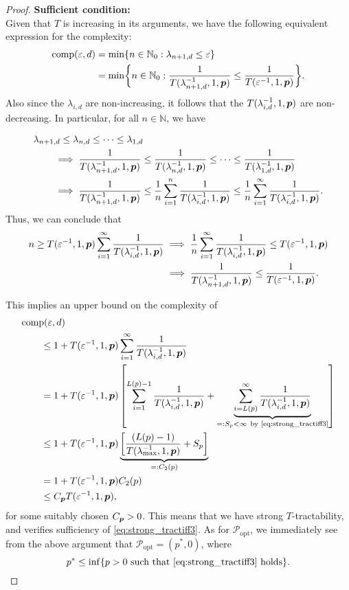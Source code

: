 \documentclass[11pt,a4paper]{article}
\begin{document}
\begin{proof}
\textbf{Sufficient condition:}\\
Given that $T$ is increasing in its arguments, we have the following equivalent expression for the complexity:
    \begin{align*}
    \operatorname{comp}(\varepsilon, d) &= \min \{n \in \mathbb{N}_{0} : \lambda_{n+1, d} \le \varepsilon\} \\
    &= \min \biggl\{n \in \mathbb{N}_{0} : \frac{1}{T(\lambda_{n+1,d}^{-1},1,\boldsymbol{p})}\le \frac{1}{T(\varepsilon^{-1},1,\boldsymbol{p}) }\biggr\}.
\end{align*}
Also since the $\lambda_{i,d}$ are non-increasing, it follows that the $T(\lambda_{i,d}^{-1},1,\boldsymbol{p})$ are non-decreasing. In particular, for all $n\in \mathbb{N}$, we have

\begin{align*}
    \MoveEqLeft{\lambda_{n+1,d} \le \lambda_{n,d} \le \cdots \le \lambda_{1,d}} \\
    & \implies \frac{1}{T(\lambda_{n+1, d}^{-1},1,\vp)} \le \frac{1}{T(\lambda_{n, d}^{-1},1,\vp)} \le \cdots \le \frac{1}{T(\lambda_{1, d}^{-1},1,\vp)} \\
    & \implies \frac{1}{T(\lambda_{n+1, d}^{-1},1,\vp) }
    \le \frac 1n \sum_{i=1}^n  \frac{1}{T(\lambda_{i, d}^{-1},1,\vp) }
    \le \frac 1n \sum_{i=1}^\infty  \frac{1}{T(\lambda_{i, d}^{-1},1,\vp)}.
\end{align*}
Thus, we can conclude that
\begin{align*}
    n \ge T(\varepsilon^{-1},1,\boldsymbol{p}) \sum_{i=1}^\infty \frac{1}{T(\lambda_{i, d}^{-1},1,\boldsymbol{p})}
    & \implies
\frac 1n \sum_{i=1}^\infty \frac{1}{T(\lambda_{i, d}^{-1},1,\boldsymbol{p}) }\le  T(\varepsilon^{-1},1,\boldsymbol{p}) \\
   & \implies   \frac{1}{T(\lambda_{n+1, d}^{-1},1,\boldsymbol{p})} \le \frac{1}{T(\varepsilon^{-1},1,\boldsymbol{p})}.
\end{align*}

This implies an upper bound on the complexity of
\begin{align*}
       \MoveEqLeft{\comp(\varepsilon,d)} \\
       &\le 1 + T(\varepsilon^{-1},1,\vp) \sum_{i=1}^\infty \frac{1}{T(\lambda_{i, d}^{-1},1,\vp)} \\
       & = 1 + T(\varepsilon^{-1},1, \vp) \left [ \sum_{i=1}^{L(p)-1} \frac{1}{T(\lambda_{i, d}^{-1},1,\vp)}
       + \underbrace{\sum_{i=L(p)}^\infty \frac{1}{T(\lambda_{i, d}^{-1},1,\vp)}}_{=:S_p <\infty\ \text{by \eqref{eq:strong_tractiff3}} }\right] \\
       & \le 1+ T(\varepsilon^{-1},1,\vp) \underbrace{\left[\frac{(L(p)-1)}{T(\lambda_{\max}^{-1},1,\vp)} + S_p\right]}_{=:C_2(p)}\\
       & = 1+ T(\varepsilon^{-1},1,\vp) C_2 (p)\\
       &\le C_{\vp} T(\varepsilon^{-1},1,\vp),
\end{align*}
for some suitably chosen $C_{\boldsymbol{p}}>0$. This means that we have strong $T$-tractability, and verifies sufficiency of \eqref{eq:strong_tractiff3}.
As for $\mathcal{P}_{\text{opt}}$, we immediately see from the above argument that $\mathcal{P}_{\text{opt}}=(p^*,0)$, where
\[
 p^* \le \inf\{p>0\ \mbox{such that \eqref{eq:strong_tractiff3} holds}\}.
\]



\end{proof}
\end{document}
